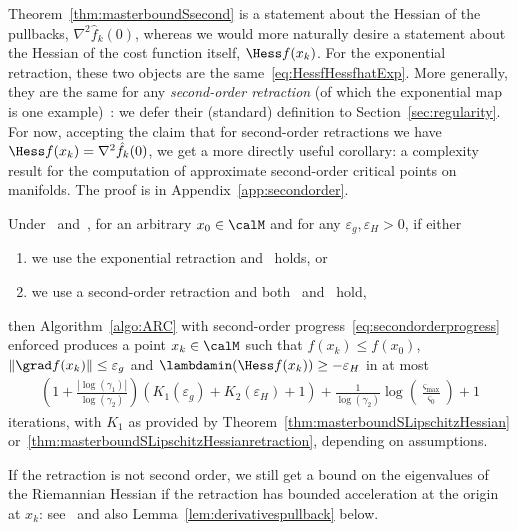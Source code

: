 Theorem~\ref{thm:masterboundSsecond} is a statement about the Hessian of the pullbacks, $\nabla^2 \hat f_k(0)$, whereas we would more naturally desire a statement about the Hessian of the cost function itself, $\Hess f(x_k)$. For the exponential retraction, these two objects are the same~\eqref{eq:HessfHessfhatExp}. More generally, they are the same for any \emph{second-order retraction} (of which the exponential map is one example)~\citep[\S5]{AMS08}: we defer their (standard) definition to Section~\ref{sec:regularity}. For now, accepting the claim that for second-order retractions we have $\Hess f(x_k) = \nabla^2 \hat f_k(0)$, we get a more directly useful corollary: a complexity result for the computation of approximate second-order critical points on manifolds. The proof is in Appendix~\ref{app:secondorder}.
\begin{corollary} \label{cor:mastercorollarysecond}
	Under~ and~,
	for an arbitrary $x_0\in\calM$
	and for any $\varepsilon_{g}, \varepsilon_{H} > 0$,
	if either
	\begin{enumerate}
		\item[(a)] we use the exponential retraction and~ holds, or
		\item[(b)] we use a second-order retraction and both~ and~ hold,
	\end{enumerate}
	then
	Algorithm~\ref{algo:ARC} with second-order progress~\eqref{eq:secondorderprogress} enforced
	produces a point $x_k \in \calM$ such that $f(x_k) \leq f(x_0)$, $\|\grad f(x_k)\| \leq \varepsilon_{g}$ and $\lambdamin(\Hess f(x_k)) \geq -\varepsilon_{H}$
	in at most
	\begin{align*}
		\left(1 + \frac{|\log(\gamma_1)|}{\log(\gamma_2)}\right)\left({K_1(\varepsilon_{g}) + K_2(\varepsilon_{H}) + 1}\right) + \frac{1}{\log(\gamma_2)}\log\left(\frac{\varsigma_{\max}}{\varsigma_0}\right) + 1
	\end{align*}
	iterations, with $K_1$ as provided by Theorem~\ref{thm:masterboundSLipschitzHessian} or~\ref{thm:masterboundSLipschitzHessianretraction}, depending on assumptions.
\end{corollary}
If the retraction is not second order, we still get a bound on the eigenvalues of the Riemannian Hessian if the retraction has bounded acceleration at the origin at $x_k$: see~\citep[\S3.5]{boumal2016globalrates} and also Lemma~\ref{lem:derivativespullback} below.






